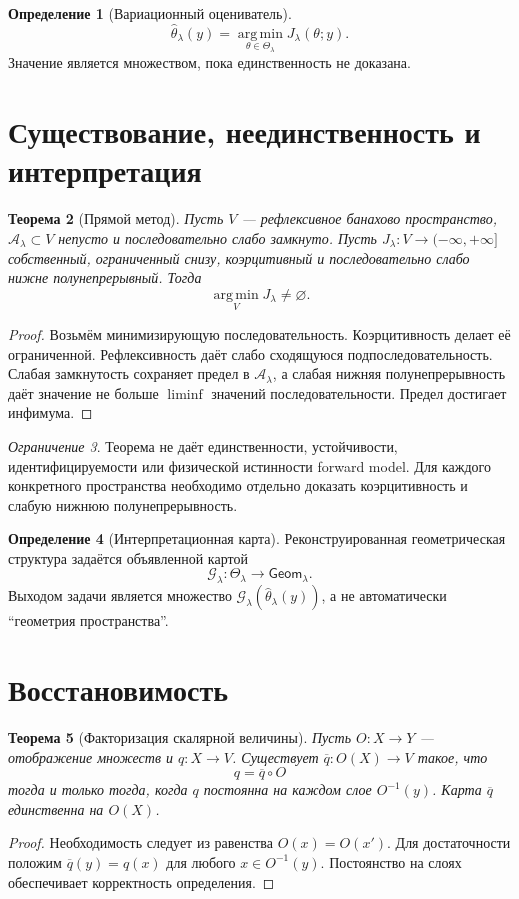 \documentclass[11pt,a4paper]{article}
\theoremstyle{definition}
\newtheorem{definition}{Определение}[section]
\theoremstyle{plain}
\newtheorem{theorem}[definition]{Теорема}
\theoremstyle{remark}
\newtheorem{warning}[definition]{Ограничение}
\newcommand{\A}{\mathcal{A}}
\newcommand{\Argmin}{\operatorname*{arg\,min}}
\begin{document}
\begin{definition}[Вариационный оцениватель]
\[
\widehat\theta_\lambda(y)
=\Argmin_{\theta\in\Theta_\lambda}J_\lambda(\theta;y).
\]
Значение является множеством, пока единственность не доказана.
\end{definition}

\section{Существование, неединственность и интерпретация}

\begin{theorem}[Прямой метод]
Пусть $V$ --- рефлексивное банахово пространство,
$\A_\lambda\subset V$ непусто и последовательно слабо замкнуто. Пусть
$J_\lambda:V\to(-\infty,+\infty]$ собственный, ограниченный снизу,
коэрцитивный и последовательно слабо нижне полунепрерывный. Тогда
\[
\Argmin_{V}J_\lambda\ne\varnothing.
\]
\end{theorem}
\begin{proof}
Возьмём минимизирующую последовательность. Коэрцитивность делает её
ограниченной. Рефлексивность даёт слабо сходящуюся подпоследовательность.
Слабая замкнутость сохраняет предел в $\A_\lambda$, а слабая нижняя
полунепрерывность даёт значение не больше $\liminf$ значений
последовательности. Предел достигает инфимума.
\end{proof}

\begin{warning}
Теорема не даёт единственности, устойчивости, идентифицируемости или
физической истинности forward model. Для каждого конкретного пространства
необходимо отдельно доказать коэрцитивность и слабую нижнюю
полунепрерывность.
\end{warning}

\begin{definition}[Интерпретационная карта]
Реконструированная геометрическая структура задаётся объявленной картой
\[
\mathcal G_\lambda:\Theta_\lambda\to\mathsf{Geom}_\lambda.
\]
Выходом задачи является множество
$\mathcal G_\lambda(\widehat\theta_\lambda(y))$, а не автоматически
``геометрия пространства''.
\end{definition}

\section{Восстановимость}

\begin{theorem}[Факторизация скалярной величины]
Пусть $O:X\to Y$ --- отображение множеств и $q:X\to V$. Существует
$\overline q:O(X)\to V$ такое, что
\[
q=\overline q\circ O
\]
тогда и только тогда, когда $q$ постоянна на каждом слое $O^{-1}(y)$.
Карта $\overline q$ единственна на $O(X)$.
\end{theorem}
\begin{proof}
Необходимость следует из равенства $O(x)=O(x')$. Для достаточности
положим $\overline q(y)=q(x)$ для любого $x\in O^{-1}(y)$.
Постоянство на слоях обеспечивает корректность определения.
\end{proof}
\end{document}
